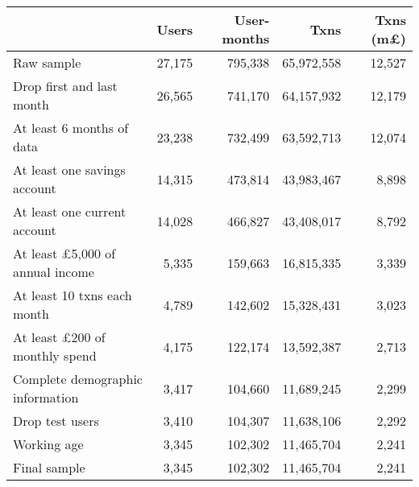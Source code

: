 \begin{tabular}{lrrrr}
\toprule
                                       &  Users & User-months &       Txns & Txns (m\pounds) \\
\midrule
                            Raw sample & 27,175 &     795,338 & 65,972,558 &          12,527 \\
             Drop first and last month & 26,565 &     741,170 & 64,157,932 &          12,179 \\
             At least 6 months of data & 23,238 &     732,499 & 63,592,713 &          12,074 \\
          At least one savings account & 14,315 &     473,814 & 43,983,467 &           8,898 \\
          At least one current account & 14,028 &     466,827 & 43,408,017 &           8,792 \\
At least \pounds5,000 of annual income &  5,335 &     159,663 & 16,815,335 &           3,339 \\
           At least 10 txns each month &  4,789 &     142,602 & 15,328,431 &           3,023 \\
  At least \pounds200 of monthly spend &  4,175 &     122,174 & 13,592,387 &           2,713 \\
      Complete demographic information &  3,417 &     104,660 & 11,689,245 &           2,299 \\
                       Drop test users &  3,410 &     104,307 & 11,638,106 &           2,292 \\
                           Working age &  3,345 &     102,302 & 11,465,704 &           2,241 \\
                          Final sample &  3,345 &     102,302 & 11,465,704 &           2,241 \\
\bottomrule
\end{tabular}
